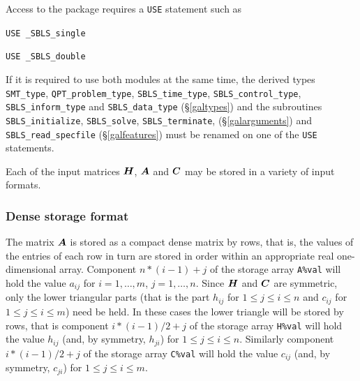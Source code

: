 \documentclass{galahad}
\newcommand{\packagename}{SBLS}
\newcommand{\fullpackagename}{\libraryname\_\packagename}
\begin{document}
\galhowto


Access to the package requires a {\tt USE} statement such as

\medskip{}

\hspace{8mm} {\tt USE \fullpackagename\_single}

\medskip{}

\hspace{8mm} {\tt USE  \fullpackagename\_double}

\medskip

\noindent
If it is required to use both modules at the same time, the derived types 
{\tt SMT\_type}, 
{\tt QPT\_problem\_type}, 
{\tt \packagename\_time\_type}, 
{\tt \packagename\_control\_type}, 
{\tt \packagename\_inform\_type} 
and
{\tt \packagename\_data\_type}
(\S\ref{galtypes})
and the subroutines
{\tt \packagename\_initialize}, 
{\tt \packagename\_\-solve},
{\tt \packagename\_terminate},
(\S\ref{galarguments})
and 
{\tt \packagename\_read\_specfile}
(\S\ref{galfeatures})
must be renamed on one of the {\tt USE} statements.


\galmatrix
Each of the input matrices ${\bm{H}}$, ${\bm{A}}$ and ${\bm{C}}$
may be stored in a variety of input formats.

\subsubsection{Dense storage format}\label{dense}
The matrix ${\bm{A}}$ is stored as a compact 
dense matrix by rows, that is, the values of the entries of each row in turn are
stored in order within an appropriate real one-dimensional array.
Component $n \ast (i-1) + j$ of the storage array {\tt A\%val} will hold the 
value $a_{ij}$ for $i = 1, \ldots , m$, $j = 1, \ldots , n$.
Since ${\bm{H}}$ and ${\bm{C}}$ are symmetric, only the lower triangular parts 
(that is the part $h_{ij}$ for $1 \leq j \leq i \leq n$ and
$c_{ij}$ for $1 \leq j \leq i \leq m$) need be held. In these cases
the lower triangle will be stored by rows, that is 
component $i \ast (i-1)/2 + j$ of the storage array {\tt H\%val}  
will hold the value $h_{ij}$ (and, by symmetry, $h_{ji}$)
for $1 \leq j \leq i \leq n$. Similarly
component $i \ast (i-1)/2 + j$ of the storage array {\tt C\%val}  
will hold the value $c_{ij}$ (and, by symmetry, $c_{ji}$)
for $1 \leq j \leq i \leq m$.
\end{document}
